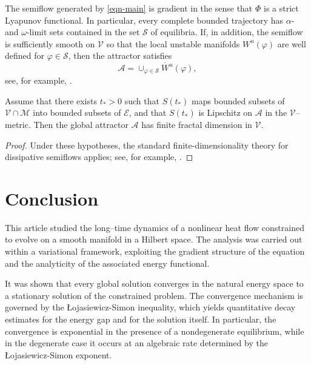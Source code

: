 \documentclass[reqno]{amsart}
\begin{document}
\begin{remark} \rm
The semiflow generated by \eqref{eqn-main} is gradient in the sense that $\Phi$ is a
strict Lyapunov functional.
In particular, every complete bounded trajectory has $\alpha$- and $\omega$-limit sets
contained in the set $\mathcal S$ of equilibria.
If, in addition, the semiflow is sufficiently smooth on $\mathcal V$ so that the
local unstable manifolds $W^{u}(\varphi)$ are well defined for $\varphi\in\mathcal S$,
then the attractor satisfies
\[
\mathcal A=\overline{\cup_{\varphi\in\mathcal S} W^{u}(\varphi)} ,
\]
see, for example, \cite[Chapter IV]{R.Temam}.
\end{remark}

\begin{corollary}
Assume that there exists $t_\ast>0$ such that $S(t_\ast)$ maps bounded subsets of
$\mathcal V\cap\mathcal M$ into bounded subsets of $\mathcal E$, and that $S(t_\ast)$
is Lipschitz on $\mathcal A$ in the $\mathcal V$--metric. Then the global attractor
$\mathcal A$ has finite fractal dimension in $\mathcal V$.
\end{corollary}

\begin{proof}
Under these hypotheses, the standard finite-dimensionality theory for dissipative
semiflows applies; see, for example, \cite[Chapters~VII--VIII]{R.Temam}.
\end{proof}

 \section{Conclusion}

This article studied the long--time dynamics of a nonlinear heat flow constrained to
evolve on a smooth manifold in a Hilbert space. The analysis was carried out within
a variational framework, exploiting the gradient structure of the equation and the
analyticity of the associated energy functional.

It was shown that every global solution converges in the natural energy space to a
stationary solution of the constrained problem. The convergence mechanism is
governed by the \L{o}jasiewicz-Simon inequality, which yields quantitative decay
estimates for the energy gap and for the solution itself. In particular,
the convergence is exponential in the presence of a nondegenerate equilibrium,
while in the degenerate case it occurs at an algebraic rate determined by the
\L{o}jasiewicz-Simon exponent.
\end{document}
